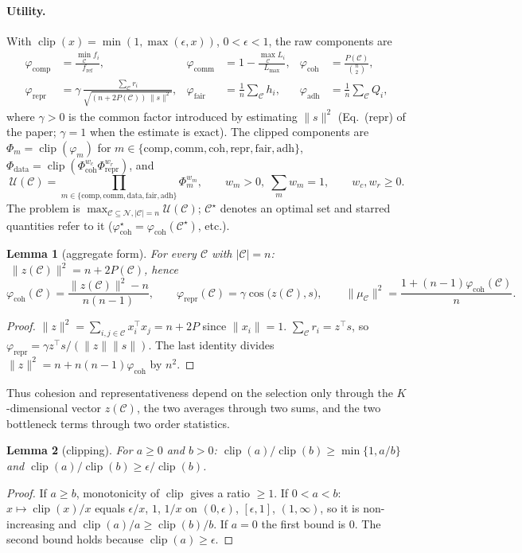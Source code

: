 \documentclass[10pt]{article}
\newtheorem{lemma}{Lemma}
\theoremstyle{remark}
\theoremstyle{definition}
\newcommand{\coh}{\varphi_{\text{coh}}}
\newcommand{\rep}{\varphi_{\text{repr}}}
\newcommand{\clip}{\operatorname{clip}}
\newcommand{\C}{\mathcal{C}}
\newcommand{\N}{\mathcal{N}}
\begin{document}
\paragraph{Utility.} With $\clip(x) = \min(1, \max(\epsilon, x))$, $0 < \epsilon < 1$, the raw components are
\begin{align*}
\varphi_{\text{comp}} &= \tfrac{\min_{\C} f_i}{f_{\text{ref}}}, &
\varphi_{\text{comm}} &= 1 - \tfrac{\max_{\C} L_i}{L_{\max}}, &
\coh &= \tfrac{P(\C)}{\binom{n}{2}}, \\
\rep &= \gamma \, \tfrac{\sum_{\C} r_i}{\sqrt{(n + 2P(\C))\,\|s\|^2}}, &
\varphi_{\text{fair}} &= \tfrac{1}{n}\textstyle\sum_{\C} h_i, &
\varphi_{\text{adh}} &= \tfrac{1}{n}\textstyle\sum_{\C} Q_i,
\end{align*}
where $\gamma > 0$ is the common factor introduced by estimating $\|s\|^2$ (Eq.~(repr) of the paper; $\gamma = 1$ when
the estimate is exact). The clipped components are $\Phi_m = \clip(\varphi_m)$ for $m \in \{\text{comp},
\text{comm}, \text{coh}, \text{repr}, \text{fair}, \text{adh}\}$, $\Phi_{\text{data}} = \clip(\Phi_{\text{coh}}^{w_c}
\Phi_{\text{repr}}^{w_r})$, and
\[
\mathcal{U}(\C) = \prod_{m \in \{\text{comp}, \text{comm}, \text{data}, \text{fair}, \text{adh}\}} \Phi_m^{w_m},
\qquad w_m > 0, \; \textstyle\sum_m w_m = 1, \qquad w_c, w_r \ge 0 .
\]
The problem is $\max_{\C \subseteq \N, |\C| = n} \mathcal{U}(\C)$; $\C^\star$ denotes an optimal set and starred
quantities refer to it ($\coh^\star = \coh(\C^\star)$, etc.).

\begin{lemma}[aggregate form]\label{lem:aggregate}
For every $\C$ with $|\C| = n$: $\;\|z(\C)\|^2 = n + 2P(\C)$, hence
\[
\coh(\C) = \frac{\|z(\C)\|^2 - n}{n(n-1)}, \qquad
\rep(\C) = \gamma \cos\big(z(\C), s\big), \qquad
\|\mu_\C\|^2 = \frac{1 + (n-1)\coh(\C)}{n} .
\]
\end{lemma}
\begin{proof}
$\|z\|^2 = \sum_{i,j \in \C} x_i^\top x_j = n + 2P$ since $\|x_i\| = 1$. $\sum_{\C} r_i = z^\top s$, so $\rep = \gamma
z^\top s / (\|z\|\|s\|)$. The last identity divides $\|z\|^2 = n + n(n-1)\coh$ by $n^2$.
\end{proof}

Thus cohesion and representativeness depend on the selection only through the $K$-dimensional vector $z(\C)$, the two
averages through two sums, and the two bottleneck terms through two order statistics.

\begin{lemma}[clipping]\label{lem:clip}
For $a \ge 0$ and $b > 0$: $\clip(a)/\clip(b) \ge \min\{1, a/b\}$ and $\clip(a)/\clip(b) \ge \epsilon/\clip(b)$.
\end{lemma}
\begin{proof}
If $a \ge b$, monotonicity of $\clip$ gives a ratio $\ge 1$. If $0 < a < b$: $x \mapsto \clip(x)/x$ equals
$\epsilon/x$, $1$, $1/x$ on $(0,\epsilon)$, $[\epsilon,1]$, $(1,\infty)$, so it is non-increasing and
$\clip(a)/a \ge \clip(b)/b$. If $a = 0$ the first bound is $0$. The second bound holds because $\clip(a) \ge
\epsilon$.
\end{proof}
\end{document}
